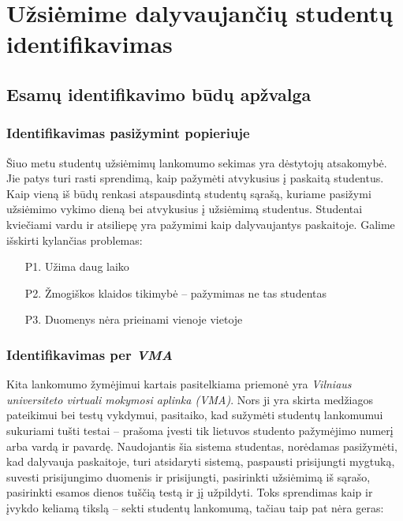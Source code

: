\documentclass{VUMIFPSbakalaurinis}
\begin{document}
\section{Užsiėmime dalyvaujančių studentų identifikavimas}

\subsection{Esamų identifikavimo būdų apžvalga}

\subsubsection{Identifikavimas pasižymint popieriuje}

Šiuo metu studentų užsiėmimų lankomumo sekimas yra dėstytojų atsakomybė. Jie patys turi rasti sprendimą, kaip pažymėti atvykusius į paskaitą studentus. Kaip vieną iš būdų renkasi atspausdintą studentų sąrašą, kuriame pasižymi užsiėmimo vykimo dieną bei atvykusius į užsiėmimą studentus. Studentai kviečiami vardu ir atsiliepę yra pažymimi kaip dalyvaujantys paskaitoje. Galime išskirti kylančias problemas:

\begin{itemize}
    \item[P1.] Užima daug laiko
    \item[P2.] Žmogiškos klaidos tikimybė – pažymimas ne tas studentas
    \item[P3.] Duomenys nėra prieinami vienoje vietoje
\end{itemize}

\subsubsection{Identifikavimas per \textit{VMA}}

Kita lankomumo žymėjimui kartais pasitelkiama priemonė yra \textit{Vilniaus universiteto virtuali mokymosi aplinka (VMA)}. Nors ji yra skirta medžiagos pateikimui bei testų vykdymui, pasitaiko, kad sužymėti studentų lankomumui sukuriami tušti testai – prašoma įvesti tik lietuvos studento pažymėjimo numerį arba vardą ir pavardę. Naudojantis šia sistema studentas, norėdamas pasižymėti, kad dalyvauja paskaitoje, turi atsidaryti sistemą, paspausti prisijungti mygtuką, suvesti prisijungimo duomenis ir prisijungti, pasirinkti užsiėmimą iš sąrašo, pasirinkti esamos dienos tuščią testą ir jį užpildyti. Toks sprendimas kaip ir įvykdo keliamą tikslą – sekti studentų lankomumą, tačiau taip pat nėra geras:
\end{document}
